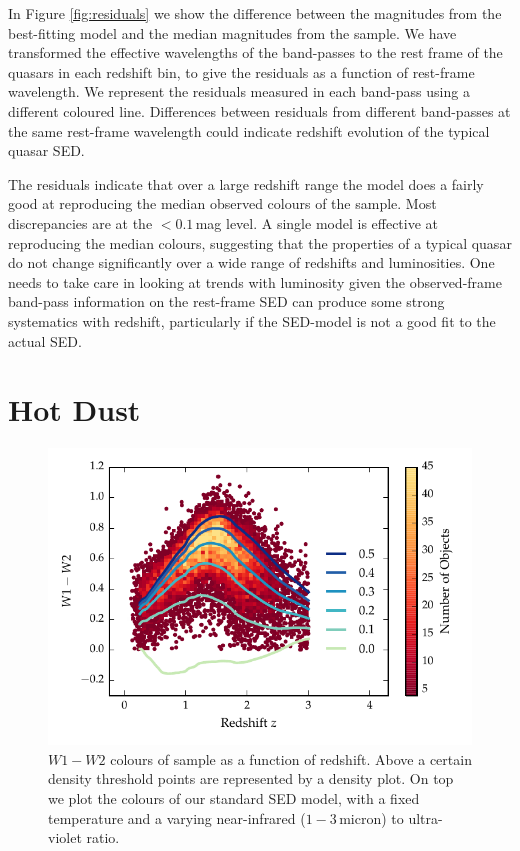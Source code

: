 In Figure \ref{fig:residuals} we show the difference between the magnitudes from the best-fitting model and the median magnitudes from the sample. 
We have transformed the effective wavelengths of the band-passes to the rest frame of the quasars in each redshift bin, to give the residuals as a function of rest-frame wavelength. 
We represent the residuals measured in each band-pass using a different coloured line. 
Differences between residuals from different band-passes at the same rest-frame wavelength could indicate redshift evolution of the typical quasar SED. 

The residuals indicate that over a large redshift range the model does a fairly good at reproducing the median observed colours of the sample. 
Most discrepancies are at the $<0.1$\,mag level. 
A single model is effective at reproducing the median colours, suggesting that the properties of a typical quasar do not change significantly over a wide range of redshifts and luminosities. 
One needs to take care in looking at trends with luminosity given the observed-frame band-pass information on the rest-frame SED can produce some strong systematics with redshift, particularly if the SED-model is not a good fit to the actual SED.

\section{Hot Dust}

\begin{figure}
\centering
\includegraphics[width=\columnwidth]{figures/chapter05/w1w2_versus_redshift_ratio.pdf}
\caption[{$W1 - W2$ colours of sample as a function of redshift.}]{$W1 - W2$ colours of sample as a function of redshift. Above a certain density threshold points are represented by a density plot. On top we plot the colours of our standard SED model, with a fixed temperature and a varying near-infrared ($1 - 3$\,micron) to ultra-violet ratio.}
  \label{fig:w1w2colorsratio}
\end{figure}


